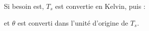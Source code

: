 Si besoin est, $T_s$ est convertie en Kelvin, puis :

et $ \theta $ est converti dans l'unit\'e d'origine de $T_s$.
